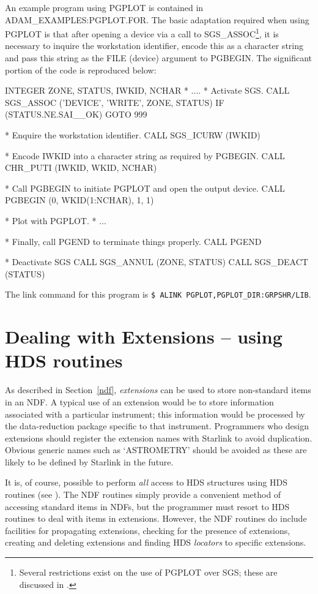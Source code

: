 \documentclass[twoside,11pt,nolof]{starlink}
\begin{document}
An example program using PGPLOT is contained in ADAM\_EXAMPLES:PGPLOT.FOR.
The basic adaptation required when using PGPLOT is that after opening
a device via a call to
SGS\_ASSOC\footnote{Several restrictions exist on the use of PGPLOT over SGS;
these are discussed in .}, it is necessary to
inquire the workstation identifier, encode this as a character string and pass
this string as the FILE (device) argument to PGBEGIN.
The significant portion of the code is reproduced below:
\begin{terminalv}
      INTEGER ZONE, STATUS, IWKID, NCHAR
*     ....
*   Activate SGS.
      CALL SGS_ASSOC ('DEVICE', 'WRITE', ZONE, STATUS)
      IF (STATUS.NE.SAI__OK) GOTO 999

*   Enquire the workstation identifier.
      CALL SGS_ICURW (IWKID)

*   Encode IWKID into a character string as required by PGBEGIN.
      CALL CHR_PUTI (IWKID, WKID, NCHAR)

*   Call PGBEGIN to initiate PGPLOT and open the output device.
      CALL PGBEGIN (0, WKID(1:NCHAR), 1, 1)

*   Plot with PGPLOT.
*     ...

*  Finally, call PGEND to terminate things properly.
      CALL PGEND

*   Deactivate SGS
      CALL SGS_ANNUL (ZONE, STATUS)
      CALL SGS_DEACT (STATUS)
\end{terminalv}
The link command for this  program is
\texttt{\$ ALINK PGPLOT,PGPLOT\_DIR:GRPSHR/LIB}.

\newpage
\section{Dealing with Extensions -- using HDS routines\label{extensions}}

As described in Section~\ref{ndf}, {\sl extensions} can be used to store
non-standard items in an NDF.
A typical use of an extension would be to store information
associated with a particular instrument;
this information would be processed by the data-reduction package specific
to that instrument.
Programmers who design extensions  should register
the extension names with Starlink to avoid duplication.
Obvious generic names such as `ASTROMETRY' should be avoided  as these are
likely to be defined by Starlink in the future.

It is, of course, possible to perform {\sl all\/} access to HDS structures
using HDS routines (see ). The NDF routines simply
provide a convenient method of accessing standard items in NDFs, but
the programmer must
resort to HDS routines to deal with items in extensions.
However, the NDF routines do include facilities for propagating extensions,
checking for the presence of extensions, creating and deleting extensions
and finding HDS {\sl locators\/} to specific extensions.
\end{document}
